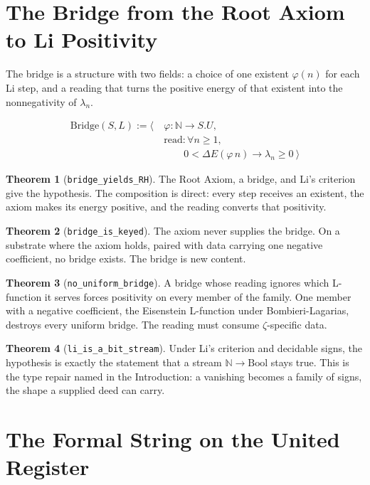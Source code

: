 \documentclass[10pt,twocolumn]{article}
\begin{document}
\hypertarget{the-bridge-from-the-root-axiom-to-li-positivity}{%
\section{The Bridge from the Root Axiom to Li
Positivity}\label{the-bridge-from-the-root-axiom-to-li-positivity}}

The bridge is a structure with two fields: a choice of one existent
\(\varphi(n)\) for each Li step, and a reading that turns the positive
energy of that existent into the nonnegativity of \(\lambda_n\).

\[\begin{aligned}\mathrm{Bridge}(S, L) := \big\langle\ &\varphi : \mathbb N \to S.U,\\ &\mathrm{read} : \forall n \geq 1,\\ &\qquad 0 < \Delta E(\varphi\, n) \to \lambda_n \geq 0 \ \big\rangle\end{aligned}\]

\textbf{Theorem 1} (\texttt{bridge\_yields\_RH}). The Root Axiom, a
bridge, and Li's criterion give the hypothesis. The composition is
direct: every step receives an existent, the axiom makes its energy
positive, and the reading converts that positivity.

\textbf{Theorem 2} (\texttt{bridge\_is\_keyed}). The axiom never
supplies the bridge. On a substrate where the axiom holds, paired with
data carrying one negative coefficient, no bridge exists. The bridge is
new content.

\textbf{Theorem 3} (\texttt{no\_uniform\_bridge}). A bridge whose
reading ignores which L-function it serves forces positivity on every
member of the family. One member with a negative coefficient, the
Eisenstein L-function under Bombieri-Lagarias, destroys every uniform
bridge. The reading must consume \(\zeta\)-specific data.

\textbf{Theorem 4} (\texttt{li\_is\_a\_bit\_stream}). Under Li's
criterion and decidable signs, the hypothesis is exactly the statement
that a stream \(\mathbb N \to \mathrm{Bool}\) stays true. This is the
type repair named in the Introduction: a vanishing becomes a family of
signs, the shape a supplied deed can carry.

\hypertarget{the-formal-string-on-the-united-register}{%
\section{The Formal String on the United
Register}\label{the-formal-string-on-the-united-register}}
\end{document}
